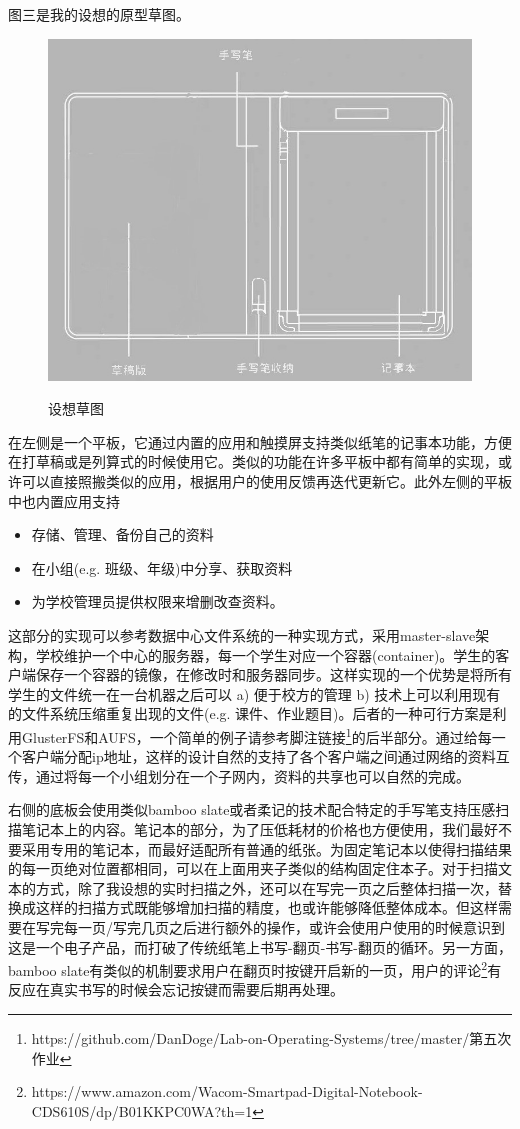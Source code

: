 \documentclass{article}
\begin{document}
图三是我的设想的原型草图。

\begin{figure}[!htb]
\centering
  \includegraphics[width=0.8\linewidth]{prototype_fine.jpg}
  \label{fig:awesome_image1}
  \caption{设想草图}
\endminipage
\end{figure}

在左侧是一个平板，它通过内置的应用和触摸屏支持类似纸笔的记事本功能，方便在打草稿或是列算式的时候使用它。类似的功能在许多平板中都有简单的实现，或许可以直接照搬类似的应用，根据用户的使用反馈再迭代更新它。此外左侧的平板中也内置应用支持

\begin{itemize}
    \item 存储、管理、备份自己的资料
    \item 在小组(e.g. 班级、年级)中分享、获取资料
    \item 为学校管理员提供权限来增删改查资料。
\end{itemize}

这部分的实现可以参考数据中心文件系统的一种实现方式，采用master-slave架构，学校维护一个中心的服务器，每一个学生对应一个容器(container)。学生的客户端保存一个容器的镜像，在修改时和服务器同步。这样实现的一个优势是将所有学生的文件统一在一台机器之后可以 a) 便于校方的管理 b) 技术上可以利用现有的文件系统压缩重复出现的文件(e.g. 课件、作业题目)。后者的一种可行方案是利用GlusterFS和AUFS，一个简单的例子请参考脚注链接\footnote{https://github.com/DanDoge/Lab-on-Operating-Systems/tree/master/第五次作业}的后半部分。通过给每一个客户端分配ip地址，这样的设计自然的支持了各个客户端之间通过网络的资料互传，通过将每一个小组划分在一个子网内，资料的共享也可以自然的完成。

右侧的底板会使用类似bamboo slate或者柔记的技术配合特定的手写笔支持压感扫描笔记本上的内容。笔记本的部分，为了压低耗材的价格也方便使用，我们最好不要采用专用的笔记本，而最好适配所有普通的纸张。为固定笔记本以使得扫描结果的每一页绝对位置都相同，可以在上面用夹子类似的结构固定住本子。对于扫描文本的方式，除了我设想的实时扫描之外，还可以在写完一页之后整体扫描一次，替换成这样的扫描方式既能够增加扫描的精度，也或许能够降低整体成本。但这样需要在写完每一页/写完几页之后进行额外的操作，或许会使用户使用的时候意识到这是一个电子产品，而打破了传统纸笔上书写-翻页-书写-翻页的循环。另一方面，bamboo slate有类似的机制要求用户在翻页时按键开启新的一页，用户的评论\footnote{https://www.amazon.com/Wacom-Smartpad-Digital-Notebook-CDS610S/dp/B01KKPC0WA?th=1}有反应在真实书写的时候会忘记按键而需要后期再处理。
\end{document}

